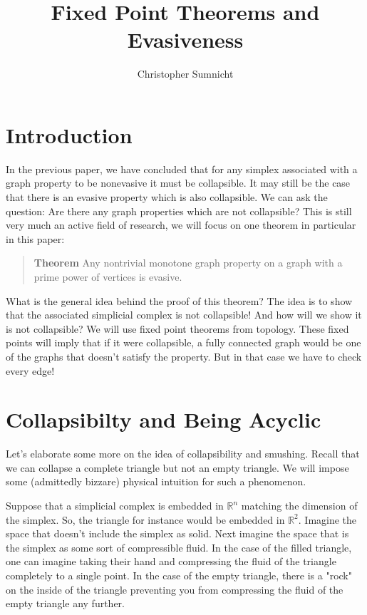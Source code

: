 \documentclass[a4paper]{article}
\begin{document}
\title{Fixed Point Theorems and Evasiveness}
\author{Christopher Sumnicht}
\maketitle

\section{Introduction}

In the previous paper, we have concluded that for any simplex associated with a graph property to be nonevasive it must be collapsible. It may still be the case that there is an evasive property which is also collapsible. We can ask the question: Are there any graph properties which are not collapsible? This is still very much an active field of research, we will focus on one theorem in particular in this paper:

\begin{quote}
    \textbf{Theorem} Any nontrivial monotone graph property on a graph with a prime power of vertices is evasive. \cite{orig}
\end{quote}

What is the general idea behind the proof of this theorem? The idea is to show that the associated simplicial complex is not collapsible! And how will we show it is not collapsible? We will use fixed point theorems from topology. These fixed points will imply that if it were collapsible, a fully connected graph would be one of the graphs that doesn't satisfy the property. But in that case we have to check every edge!

\section{Collapsibilty and Being Acyclic}

Let's elaborate some more on the idea of collapsibility and smushing. Recall that we can collapse a complete triangle but not an empty triangle. We will impose some (admittedly bizzare) physical intuition for such a phenomenon.

Suppose that a simplicial complex is embedded in $\mathbb{R}^n$ matching the dimension of the simplex. So, the triangle for instance would be embedded in $\mathbb{R}^2$. Imagine the space that doesn't include the simplex as solid. Next imagine the space that is the simplex as some sort of compressible fluid. In the case of the filled triangle, one can imagine taking their hand and compressing the fluid of the triangle completely to a single point. In the case of the empty triangle, there is a "rock" on the inside of the triangle preventing you from compressing the fluid of the empty triangle any further.
\end{document}
